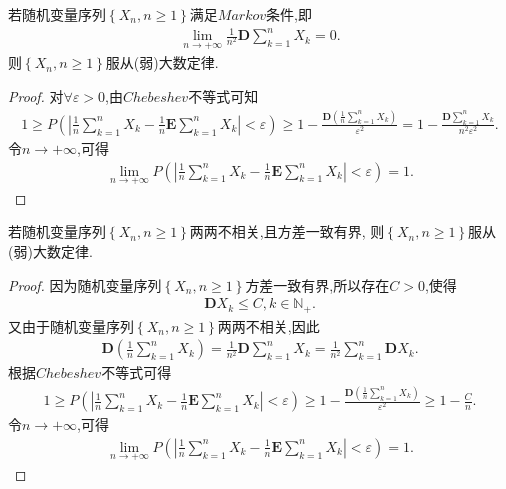\documentclass[lang=cn,newtx,10pt,scheme=chinese]{../../Template/elegantbook}
\begin{document}
\begin{theorem}[Markov大数定律]\label{theorem:Markov大数定律}
    若随机变量序列$\left\{ X_n,n\ge 1 \right\}$满足$Markov$条件,即
    \begin{align*}
        \underset{n\rightarrow +\infty}{\lim}\frac{1}{n^2}\boldsymbol{D}\sum_{k=1}^n{X_k}=0.
    \end{align*}
    则$\left\{ X_n,n\ge 1 \right\}$服从(弱)大数定律.
\end{theorem}
\begin{proof}
    对$\forall \varepsilon>0$,由$Chebeshev$不等式可知
    \begin{align*}
        1\geqslant P\left( \left| \frac{1}{n}\sum_{k=1}^n{X_k}-\frac{1}{n}\boldsymbol{E}\sum\limits_{k=1}^n{X_k} \right|<\varepsilon \right) \geqslant 1-\frac{\boldsymbol{D}\left( \frac{1}{n}\sum\limits_{k=1}^n{X_k} \right)}{\varepsilon ^2}=1-\frac{\boldsymbol{D}\sum\limits_{k=1}^n{X_k}}{n^2\varepsilon ^2}.
    \end{align*}
    令$n\to +\infty$,可得
    \begin{align*}
        \underset{n\rightarrow +\infty}{\lim}P\left( \left| \frac{1}{n}\sum_{k=1}^n{X_k}-\frac{1}{n}\boldsymbol{E}\sum_{k=1}^n{X_k} \right|<\varepsilon \right) =1.
    \end{align*}
\end{proof}

\begin{theorem}[Chebeshev大数定律]\label{theorem:Chebeshev大数定律}
    若随机变量序列$\left\{ X_n,n\ge 1 \right\}$两两不相关,且方差一致有界,
    则$\left\{ X_n,n\ge 1 \right\}$服从(弱)大数定律.
\end{theorem}
\begin{proof}
    因为随机变量序列$\left\{ X_n,n\ge 1 \right\}$方差一致有界,所以存在$C>0$,使得
    \begin{align*}
        \boldsymbol{D}X_k\leqslant C,k\in \mathbb{N}_+.
    \end{align*}
    又由于随机变量序列$\left\{ X_n,n\ge 1 \right\}$两两不相关,因此
    \begin{align*}
        \boldsymbol{D}\left( \frac{1}{n}\sum_{k=1}^n{X_k} \right) =\frac{1}{n^2}\boldsymbol{D}\sum_{k=1}^n{X_k}=\frac{1}{n^2}\sum_{k=1}^n{\boldsymbol{D}X_k}.
    \end{align*}
    根据$Chebeshev$不等式可得
    \begin{align*}
        1\geqslant P\left( \left| \frac{1}{n}\sum_{k=1}^n{X_k}-\frac{1}{n}\boldsymbol{E}\sum_{k=1}^n{X_k} \right|<\varepsilon \right) \geqslant 1-\frac{\boldsymbol{D}\left( \frac{1}{n}\sum\limits_{k=1}^n{X_k} \right)}{\varepsilon ^2}\geqslant 1-\frac{C}{n}.
    \end{align*}
    令$n\to +\infty$,可得
    \begin{align*}
        \underset{n\rightarrow +\infty}{\lim}P\left( \left| \frac{1}{n}\sum_{k=1}^n{X_k}-\frac{1}{n}\boldsymbol{E}\sum_{k=1}^n{X_k} \right|<\varepsilon \right) =1.
    \end{align*}
\end{proof}
\end{document}
